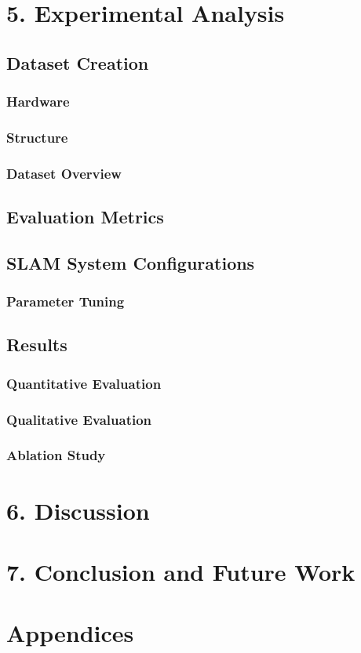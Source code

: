 \documentclass[12pt]{article}
\begin{document}
\section{5. Experimental Analysis}

\subsection{Dataset Creation}

\subsubsection{Hardware}

\subsubsection{Structure}

\subsubsection{Dataset Overview}

\subsection{Evaluation Metrics}

\subsection{SLAM System Configurations}

\subsubsection{Parameter Tuning}

\subsection{Results}

\subsubsection{Quantitative Evaluation}

\subsubsection{Qualitative Evaluation}

\subsubsection{Ablation Study}

\section{6. Discussion}

\section{7. Conclusion and Future Work}

\section{Appendices}
\end{document}
